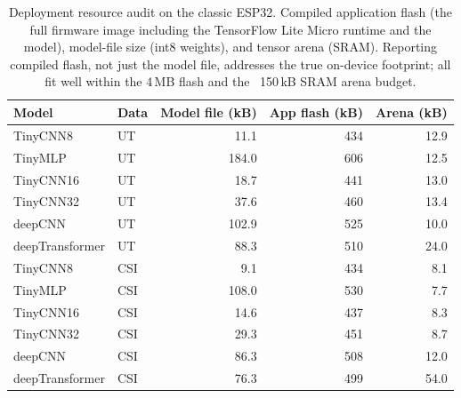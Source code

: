 \begin{table}[t]
\centering
\caption{Deployment resource audit on the classic ESP32. Compiled application flash
(the full firmware image including the TensorFlow Lite Micro runtime and the model),
model-file size (int8 weights), and tensor arena (SRAM). Reporting compiled flash, not
just the model file, addresses the true on-device footprint; all fit well within the
4\,MB flash and the ~150\,kB SRAM arena budget.}
\label{tab:resource}
\begin{tabular}{llrrr}
\hline
Model & Data & Model file (kB) & App flash (kB) & Arena (kB) \\
\hline
TinyCNN8        & UT  & 11.1  & 434 & 12.9 \\
TinyMLP         & UT  & 184.0 & 606 & 12.5 \\
TinyCNN16       & UT  & 18.7  & 441 & 13.0 \\
TinyCNN32       & UT  & 37.6  & 460 & 13.4 \\
deepCNN         & UT  & 102.9 & 525 & 10.0 \\
deepTransformer & UT  & 88.3  & 510 & 24.0 \\
TinyCNN8        & CSI & 9.1   & 434 & 8.1 \\
TinyMLP         & CSI & 108.0 & 530 & 7.7 \\
TinyCNN16       & CSI & 14.6  & 437 & 8.3 \\
TinyCNN32       & CSI & 29.3  & 451 & 8.7 \\
deepCNN         & CSI & 86.3  & 508 & 12.0 \\
deepTransformer & CSI & 76.3  & 499 & 54.0 \\
\hline
\end{tabular}
\end{table}

